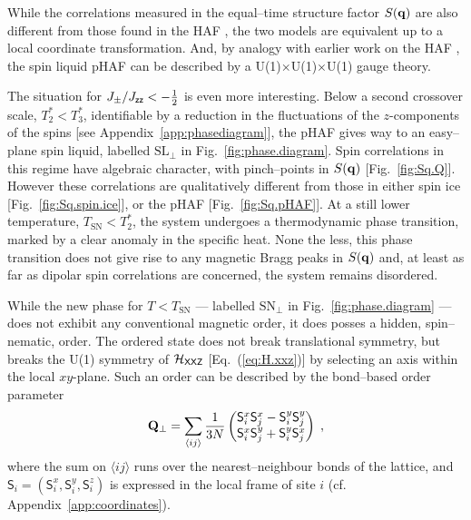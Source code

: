\documentclass[apsrev4-1,prx,superscriptaddress,floatfix,twocolumn,longbibliography]{revtex4-1}
\begin{document}

While the correlations measured in the equal--time structure factor $S({\bf q})$
are also different from those found in the HAF 
\mbox{\cite{moessner98-PRB58,Isakov2004a,conlon09}}, 
the two models are equivalent up to a local coordinate transformation.     
%
And, by analogy with earlier work on the HAF \cite{Isakov2004a,henley05,henley10}, 
the spin liquid pHAF can be described by a 
U(1)$\times$U(1)$\times$U(1) gauge theory.
%


The situation for \mbox{$J_{\pm}/J_{\sf zz} < -\frac{1}{2}$} is even more interesting.
%
Below a second crossover scale, $T^*_2 < T^*_3$, 
identifiable by a reduction in the fluctuations of the $z$-components
of the spins [see Appendix~\ref{app:phasediagram}], 
the pHAF gives way to an easy--plane spin liquid, 
labelled $\text{SL}_\perp$ in Fig.~\ref{fig:phase.diagram}.  
%
Spin correlations in this regime have algebraic character, 
with pinch--points in $S({\bf q})$ [Fig.~\ref{fig:Sq.Q}].   
%
However these correlations are qualitatively different from 
those in either spin ice [Fig.~\ref{fig:Sq.spin.ice}], 
or the pHAF [Fig.~\ref{fig:Sq.pHAF}].  
%
At a still lower temperature, $T_\text{SN}  < T^*_2$, the 
system undergoes a thermodynamic phase transition, 
marked by a clear anomaly in the specific heat.
%
None the less, this phase transition does not give rise to any magnetic 
Bragg peaks in $S({\bf q})$ and, at least as far as dipolar spin 
correlations are concerned, the system remains disordered.


While the new phase for $T < T_\text{SN}$ --- labelled $\text{SN}_\perp$ in
Fig.~\ref{fig:phase.diagram} --- does not exhibit any conventional
magnetic order, it does posses a hidden, spin--nematic, order.
%
The ordered state does not break translational symmetry, but breaks 
the U(1) symmetry of $\mathcal{H}_{\sf XXZ}$ [Eq.~(\ref{eq:H.xxz})] by 
selecting an axis within the local $xy$-plane.
%
Such an order can be described by the bond--based order 
parameter \cite{andreev84, chubukov91, shannon06}
\begin{eqnarray}
{\bf Q}_{\perp}=\sum_{\langle ij \rangle}
 \frac{1}{3N} 
\begin{pmatrix}
{\sf S}^x_i {\sf S}^x_j-{\sf S}^y_i {\sf S}^y_j \\
{\sf S}^x_i {\sf S}^y_j+{\sf S}^y_i {\sf S}^x_j 
\label{eq:bond.nematic}
\end{pmatrix} \; ,
\end{eqnarray}
%
where the sum on $\langle ij \rangle$ runs over the nearest--neighbour bonds 
of the lattice, and $\mathsf{S}_i = (\mathsf{S}^x_i, \mathsf{S}^y_i, \mathsf{S}^z_i)$ 
is expressed in the local frame of site $i$ (cf. Appendix~\ref{app:coordinates}).  
%
\end{document}
